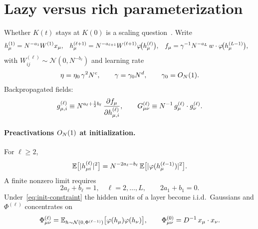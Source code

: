 \section{Lazy versus rich parameterization}
\label{sec:lazy}

Whether $K(t)$ stays at $K(0)$ is a scaling question~\cite{pehlevan2023infinite}. Write
\begin{align}
  h^{(1)}_\mu &= N^{-a_1} W^{(1)} x_\mu, &
  h^{(\ell+1)}_\mu &= N^{-a_{\ell+1}} W^{(\ell+1)}\varphi\!\big(h^{(\ell)}_\mu\big), &
  f_\mu &= \gamma^{-1} N^{-a_L}\, w\cdot\varphi\!\big(h^{(L-1)}_\mu\big),
  \label{eq:pb-mlp}
\end{align}
with $W^{(\ell)}_{ij}\sim\mathcal{N}(0,N^{-b_\ell})$ and learning rate
\begin{equation}
  \eta=\eta_0\,\gamma^2 N^{c},
  \qquad
  \gamma=\gamma_0 N^{d},\qquad \gamma_0=O_{N}(1).
  \label{eq:lr-scale}
\end{equation}
Backpropagated fields:
\begin{equation}
  g^{(\ell)}_{\mu,i}
  \equiv
  N^{a_{\ell}+\frac12 b_{\ell}}\,
  \frac{\partial f_\mu}{\partial h^{(\ell)}_{\mu,i}},
  \qquad
  G^{(\ell)}_{\mu\nu}
  \equiv
  N^{-1}\, g^{(\ell)}_\mu\cdot g^{(\ell)}_\nu.
  \label{eq:G-kernel}
\end{equation}

\paragraph{Preactivations $O_{N}(1)$ at initialization.}
For $\ell\ge 2$,
\begin{equation}
  \mathbb{E}\bigl[\lvert h^{(\ell)}_{\mu i}\rvert^2\bigr]
  =N^{-2a_\ell-b_\ell}\,
  \mathbb{E}\bigl[\lvert\varphi(h^{(\ell-1)}_\mu)\rvert^2\bigr].
  \label{eq:h-var}
\end{equation}
A finite nonzero limit requires
\begin{equation}
  2a_\ell+b_\ell=1,\quad \ell=2,\ldots,L,
  \qquad
  2a_1+b_1=0.
  \label{eq:init-constraint}
\end{equation}
Under~\eqref{eq:init-constraint} the hidden units of a layer become i.i.d.\ Gaussians and $\Phi^{(\ell)}$ concentrates on
\begin{equation}
  \Phi^{(\ell)}_{\mu\nu}
  =\mathbb{E}_{h\sim\mathcal{N}(0,\Phi^{(\ell-1)})}\bigl[\varphi(h_\mu)\varphi(h_\nu)\bigr],
  \qquad
  \Phi^{(0)}_{\mu\nu}=D^{-1}\,x_\mu\cdot x_\nu.
  \label{eq:phi-rec-init}
\end{equation}

